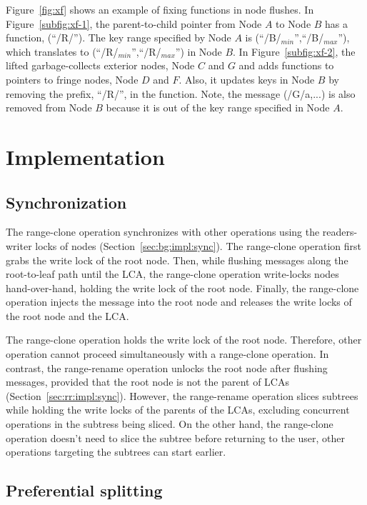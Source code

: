 Figure~\ref{fig:xf} shows an example of fixing \xf functions in node flushes.
In Figure~\ref{subfig:xf-1}, the parent-to-child pointer from Node $A$ to
Node $B$ has a \xf function, \xf(``/R/'').
The key range specified by Node $A$ is (``/B/$_{min}$'',``/B/$_{max}$''), which
translates to (``/R/$_{min}$'',``/R/$_{max}$'') in Node $B$.
In Figure~\ref{subfig:xf-2}, the lifted \bedag garbage-collects exterior nodes,
Node $C$ and $G$
and adds \xf functions to pointers to fringe nodes, Node $D$ and $F$.
Also, it updates keys in Node $B$ by removing the prefix, ``/R/'',
in the \xf function.
Note, the message \putm(/G/a,...) is also removed from Node $B$
because it is out of the key range specified in Node $A$.

\section{Implementation}
\label{sec:rc:impl}

\subsection{Synchronization}

The range-clone operation synchronizes with other \bet operations using the
readers-writer locks of \bet nodes
(Section~\ref{sec:bg:impl:sync}).
The range-clone operation first grabs the write lock of the root node.
Then, while flushing messages along the root-to-leaf path until the LCA,
the range-clone operation write-locks \bet nodes hand-over-hand,
holding the write lock of the root node.
Finally, the range-clone operation injects the \goto message into the root node
and releases the write locks of the root node and the LCA.

The range-clone operation holds the write lock of the root node.
Therefore, other operation cannot proceed simultaneously with a range-clone
operation.
In contrast, the range-rename operation unlocks the root node after flushing
messages, provided that the root node is not the parent of LCAs
(Section~\ref{sec:rr:impl:sync}).
However, the range-rename operation slices subtrees while holding the write
locks of the parents of the LCAs,
excluding concurrent \bet operations in the subtress being sliced.
On the other hand,
the range-clone operation doesn't need to slice the subtree before returning to
the user,
other \bet operations targeting the subtrees can start earlier.

\subsection{Preferential splitting}
\label{sec:rc:impl:pfsplit}

